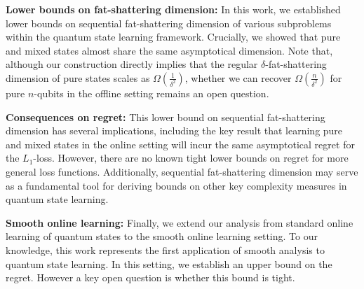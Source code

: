
\textbf{Lower bounds on fat-shattering dimension:} In this work, we established lower bounds on sequential fat-shattering dimension of various subproblems within the quantum state learning framework. Crucially, we showed that pure and mixed states almost share the same asymptotical dimension. Note that, although our construction directly implies that the regular $\delta$-fat-shattering dimension of pure states scales as $\Omega(\frac 1{\delta^2})$, whether we can recover $\Omega(\frac n{\delta^2})$ for pure $n$-qubits in the offline setting remains an open question.  

\textbf{Consequences on regret:} This lower bound on sequential fat-shattering dimension has several implications, including the key result that learning pure and mixed states in the online setting will incur the same asymptotical regret for the $L_1$-loss. However, there are no known tight lower bounds on regret for more general loss functions. Additionally, sequential fat-shattering dimension may serve as a fundamental tool for deriving bounds on other key complexity measures in quantum state learning.

\textbf{Smooth online learning:} Finally, we extend our analysis from standard online learning of quantum states to the smooth online learning setting. To our knowledge, this work represents the first application of smooth analysis to quantum state learning. In this setting, we establish an upper bound on the regret. However a key open question is whether this bound is tight.